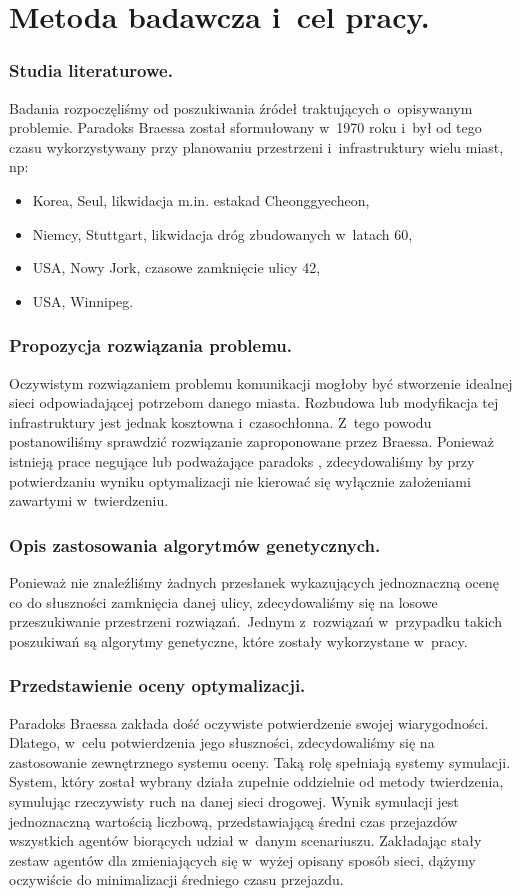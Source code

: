 \documentclass[twoside,12pt]{report}
\begin{document}
\section{Metoda badawcza i~cel pracy.}
\subsubsection{Studia literaturowe.}
Badania rozpoczęliśmy od poszukiwania źródeł traktujących o~opisywanym problemie. Paradoks Braessa został sformułowany w~1970 roku i~był od tego czasu wykorzystywany przy planowaniu przestrzeni i~infrastruktury wielu miast, np:

\begin{itemize}
\item Korea, Seul, likwidacja m.in. estakad Cheonggyecheon,
\item Niemcy, Stuttgart, likwidacja dróg zbudowanych w~latach 60,
\item USA, Nowy Jork, czasowe zamknięcie ulicy 42,
\item USA, Winnipeg.\cite{urban}
\end{itemize}  

\subsubsection{Propozycja rozwiązania problemu.}
Oczywistym rozwiązaniem problemu komunikacji mogłoby być stworzenie idealnej sieci odpowiadającej potrzebom danego miasta. Rozbudowa lub modyfikacja tej infrastruktury jest jednak kosztowna i~czasochłonna. Z~tego powodu postanowiliśmy sprawdzić rozwiązanie zaproponowane przez Braessa. Ponieważ istnieją prace negujące lub podważające paradoks\cite{newinsights} , zdecydowaliśmy by przy potwierdzaniu wyniku optymalizacji nie kierować się wyłącznie założeniami zawartymi w~twierdzeniu.

\subsubsection{Opis zastosowania algorytmów genetycznych.}
Ponieważ nie znaleźliśmy żadnych przesłanek wykazujących jednoznaczną ocenę co do słuszności zamknięcia danej ulicy, zdecydowaliśmy się na losowe przeszukiwanie przestrzeni rozwiązań.~Jednym z~rozwiązań w~przypadku takich poszukiwań są algorytmy genetyczne, które zostały wykorzystane w~pracy.

\subsubsection{Przedstawienie oceny optymalizacji.}
Paradoks Braessa zakłada dość oczywiste potwierdzenie swojej wiarygodności. Dlatego, w~celu potwierdzenia jego słuszności, zdecydowaliśmy się na zastosowanie zewnętrznego systemu oceny. Taką rolę spełniają systemy symulacji. System, który został wybrany działa zupełnie oddzielnie od metody twierdzenia, symulując rzeczywisty ruch na danej sieci drogowej. Wynik symulacji jest jednoznaczną wartością liczbową, przedstawiającą średni czas przejazdów wszystkich agentów biorących udział w~danym scenariuszu. Zakładając stały zestaw agentów dla zmieniających się w~wyżej opisany sposób sieci, dążymy oczywiście do minimalizacji średniego czasu przejazdu.
\end{document}
